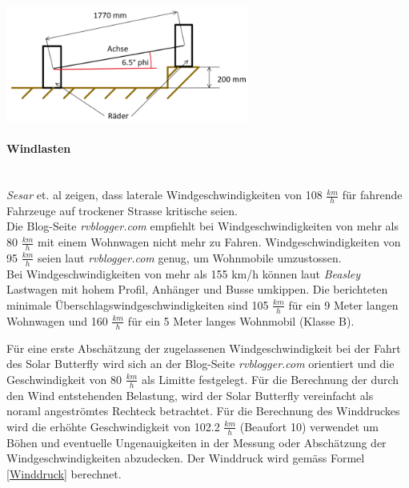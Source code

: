 \begin{description}
    \begin{center}
      \includegraphics[width=0.6\textwidth]{04_Figures/1.5 Skizze.png}
      \label{1.5 Skizze}
    \end{center}

  \end{description}

  \paragraph{Windlasten}\mbox{}\\
  \emph{Sesar} et. al \cite{Wind.1} zeigen, dass laterale Windgeschwindigkeiten von 108 $\frac{km}{h}$ für fahrende Fahrzeuge auf trockener Strasse kritische seien.\\
  Die Blog-Seite \emph{rvblogger.com} \cite{Wind.2} empfiehlt bei Windgeschwindigkeiten von mehr als 80 $\frac{km}{h}$ mit einem Wohnwagen nicht mehr zu Fahren. Windgeschwindigkeiten von 95 $\frac{km}{h}$ seien laut \emph{rvblogger.com} genug, um Wohnmobile umzustossen.\\
  Bei Windgeschwindigkeiten von mehr als 155 km/h können laut \emph{Beasley} \cite{Wind.3} Lastwagen mit hohem Profil, Anhänger und Busse umkippen. Die berichteten minimale Überschlagswindgeschwindigkeiten sind 105 $\frac{km}{h}$ für ein 9 Meter langen Wohnwagen und 160 $\frac{km}{h}$ für ein 5 Meter langes Wohnmobil (Klasse B).

  Für eine erste Abschätzung der zugelassenen Windgeschwindigkeit bei der Fahrt des Solar Butterfly wird sich an der Blog-Seite \emph{rvblogger.com} orientiert und die Geschwindigkeit von 80 $\frac{km}{h}$ als Limitte festgelegt. Für die Berechnung der durch den Wind entstehenden Belastung, wird der Solar Butterfly vereinfacht als noraml angeströmtes Rechteck betrachtet. Für die Berechnung des Winddruckes wird die erhöhte Geschwindigkeit von 102.2 $\frac{km}{h}$ (Beaufort 10) verwendet um Böhen und eventuelle Ungenauigkeiten in der Messung oder Abschätzung der Windgeschwindigkeiten abzudecken. Der Winddruck wird gemäss Formel \ref{Winddruck} berechnet.

